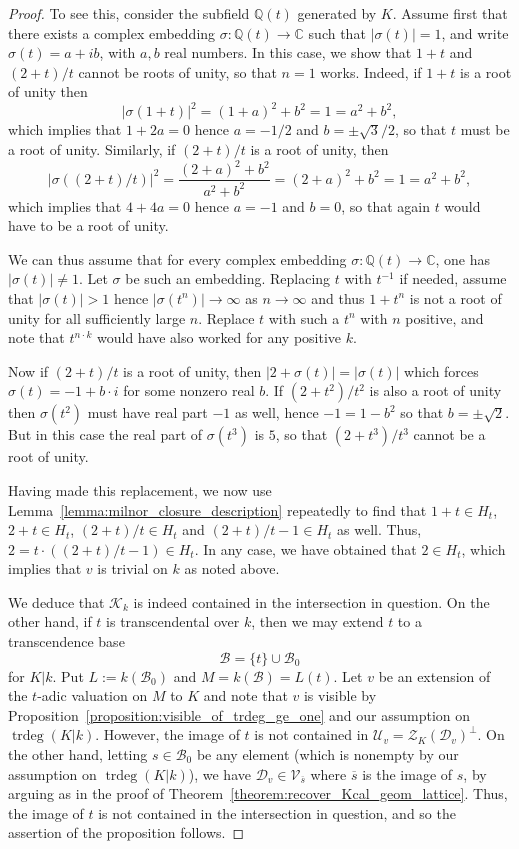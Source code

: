 \documentclass[12pt]{amsart}
\newcommand{\Qbb}{\mathbb{Q}}
\newcommand{\Cbb}{\mathbb{C}}
\newcommand{\trdeg}{\operatorname{trdeg}}
\newcommand{\Bcal}{\mathcal{B}}
\newcommand{\Vscr}{\mathscr{V}}
\newcommand{\Zcal}{\mathcal{Z}}
\newcommand{\Dcal}{\mathcal{D}}
\newcommand{\Ucal}{\mathcal{U}}
\newcommand{\Kcal}{\mathcal{K}}
\renewcommand{\bar}{\overline}
\theoremstyle{definition}
\begin{document}
\begin{proof}
  To see this, consider the subfield $\Qbb(t)$ generated by $K$.
  Assume first that there exists a complex embedding $\sigma : \Qbb(t) \to \Cbb$ such that $|\sigma(t)| = 1$, and write $\sigma(t) = a + i b$, with $a,b$ real numbers.
  In this case, we show that $1 + t$ and $(2+t)/t$ cannot be roots of unity, so that $n = 1$ works.
  Indeed, if $1 + t$ is a root of unity then
  \[ |\sigma(1+t)|^{2} = (1+a)^{2} + b^{2} = 1 = a^{2} + b^{2}, \]
  which implies that $1 + 2a = 0$ hence $a = -1/2$ and $b = \pm \sqrt{3}/2$, so that $t$ must be a root of unity.
  Similarly, if $(2+t)/t$ is a root of unity, then
  \[ |\sigma((2+t)/t)|^{2} = \frac{(2+a)^{2} + b^{2}}{a^{2}+b^{2}} = (2+a)^{2} + b^{2} = 1 = a^{2} + b^{2}, \]
  which implies that $4 + 4a = 0$ hence $a = -1$ and $b = 0$, so that again $t$ would have to be a root of unity.

  We can thus assume that for every complex embedding $\sigma : \Qbb(t) \to \Cbb$, one has $|\sigma(t)| \neq 1$.
  Let $\sigma$ be such an embedding.
  Replacing $t$ with $t^{-1}$ if needed, assume that $|\sigma(t)| > 1$ hence $|\sigma(t^{n})| \to \infty$ as $n \to \infty$ and thus $1+t^{n}$ is not a root of unity for all sufficiently large $n$.
  Replace $t$ with such a $t^{n}$ with $n$ positive, and note that $t^{n \cdot k}$ would have also worked for any positive $k$.

  Now if $(2+t)/t$ is a root of unity, then $|2 + \sigma(t)| = |\sigma(t)|$ which forces $\sigma(t) = -1 + b \cdot i$ for some nonzero real $b$.
  If $(2+t^{2})/t^{2}$ is also a root of unity then $\sigma(t^{2})$ must have real part $-1$ as well, hence $-1 = 1 - b^{2}$ so that $b = \pm\sqrt{2}$.
  But in this case the real part of $\sigma(t^{3})$ is $5$, so that $(2 + t^{3})/t^{3}$ cannot be a root of unity.

  Having made this replacement, we now use Lemma~\ref{lemma:milnor_closure_description} repeatedly to find that $1 + t \in H_{t}$, $2 + t \in H_{t}$, $(2+t)/t \in H_{t}$ and $(2+t)/t-1 \in H_{t}$ as well.
  Thus, $2 = t \cdot ((2+t)/t - 1) \in H_{t}$.
  In any case, we have obtained that $2 \in H_{t}$, which implies that $v$ is trivial on $k$ as noted above.

  We deduce that $\Kcal_{k}$ is indeed contained in the intersection in question.
  On the other hand, if $t$ is transcendental over $k$, then we may extend $t$ to a transcendence base
  \[ \Bcal = \{t\} \cup \Bcal_{0} \]
  for $K|k$.
  Put $L := k(\Bcal_{0})$ and $M = k(\Bcal) = L(t)$.
  Let $v$ be an extension of the $t$-adic valuation on $M$ to $K$ and note that $v$ is visible by Proposition~\ref{proposition:visible_of_trdeg_ge_one} and our assumption on $\trdeg(K|k)$.
  However, the image of $t$ is not contained in $\Ucal_{v} = \Zcal_{K}(\Dcal_{v})^{\perp}$.
  On the other hand, letting $s \in \Bcal_{0}$ be any element (which is nonempty by our assumption on $\trdeg(K|k)$), we have $\Dcal_{v} \in \Vscr_{\bar s}$ where $\bar s$ is the image of $s$, by arguing as in the proof of Theorem~\ref{theorem:recover_Kcal_geom_lattice}.
  Thus, the image of $t$ is not contained in the intersection in question, and so the assertion of the proposition follows.
\end{proof}
\end{document}
